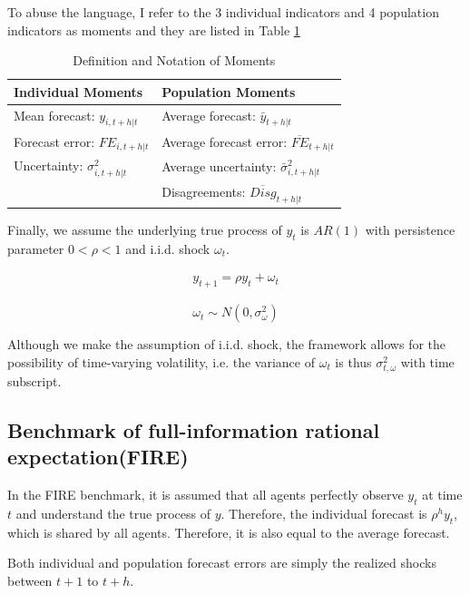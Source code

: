 \documentclass[]{article}
\begin{document}
	To abuse the language, I refer to the 3 individual indicators and 4 population indicators as moments and they are  listed in Table \ref{MomSum} 
	
	\begin{table}[ht]
		\centering
		\caption{Definition and Notation of Moments}
		\label{MomSum}
		\begin{tabular}{ll}
			
			\hline 
			Individual Moments                                  & Population Moments                             \\
			\hline 
			Mean forecast: $y_{i,t+h|t}$                   & Average forecast: $\bar y_{t+h|t}$                   \\
			Forecast error: $FE_{i,t+h|t}$ & Average forecast error: $\overline{FE}_{t+h|t}$ \\
			Uncertainty: $\sigma^2_{i,t+h|t}$         & Average uncertainty:  $\bar \sigma^2_{i,t+h|t}$ \\
			& Disagreements:  $\overline{Disg}_{t+h|t}$       \\
			\hline 
		\end{tabular}
	\end{table}
	
	Finally, we assume the underlying true process of $y_{t}$ is $AR(1)$ with persistence parameter $0<\rho <1$ and i.i.d. shock $\omega_t$. 
	
	\begin{eqnarray}\label{AR_process}
		y_{t+1} = \rho y_t + \omega_t
	\end{eqnarray}
	
	$$\omega_t \sim N(0,\sigma^2_{\omega})$$
	
	Although we make the assumption of i.i.d. shock, the framework allows for the possibility of time-varying volatility, i.e. the variance of $\omega_t$ is thus $\sigma^2_{t,\omega}$ with time subscript. 
	
	\subsection{Benchmark of full-information rational expectation(FIRE)}
	
	In the FIRE benchmark,  it is assumed that all agents perfectly observe $y_t$ at time $t$ and understand the true process of $y$. Therefore, the individual forecast is $\rho^h y_t $, which is shared by all agents. Therefore, it is also equal to the average forecast. 
	
	Both individual and population forecast errors are simply the realized shocks between $t+1$ to $t+h$.  
	
\end{document}
